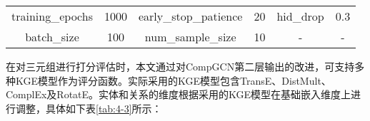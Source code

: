 \begin{table}[h]
{\begin{tabular}{@{}cccccc@{}}
  {\color[HTML]{333333} training\_epochs} & \multicolumn{1}{c|}{{\color[HTML]{333333} 1000}}    & {\color[HTML]{333333} early\_stop\_patience} & \multicolumn{1}{c|}{{\color[HTML]{333333} 20}}     & {\color[HTML]{333333} hid\_drop}      & {\color[HTML]{333333} 0.3}          \\
  {\color[HTML]{333333} batch\_size}      & \multicolumn{1}{c|}{{\color[HTML]{333333} 100}}     & {\color[HTML]{333333} num\_sample\_size}     & \multicolumn{1}{c|}{{\color[HTML]{333333} 10}}     & {\color[HTML]{333333} -}             & {\color[HTML]{333333} -}            \\ \bottomrule
  \end{tabular}%
  }
  \end{table}

在对三元组进行打分评估时，本文通过对CompGCN第二层输出的改进，可支持多种KGE模型作为评分函数。实际采用的KGE模型包含TransE、DistMult、ComplEx及RotatE。实体和关系的维度根据采用的KGE模型在基础嵌入维度上进行调整，具体如下表\ref{tab:4-3}所示：
\begin{table}[h]
  \caption{评分函数}
  \label{tab:4-3}
  \centering
  \end{table}
